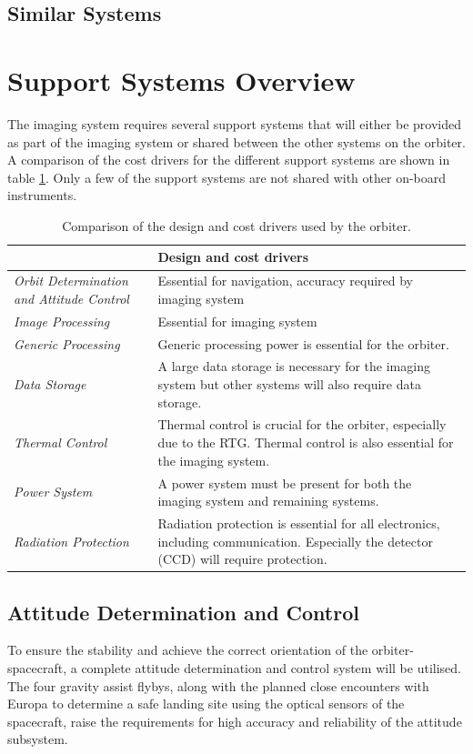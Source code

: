 \subsection{Similar Systems}
\section{Support Systems Overview}
The imaging system requires several support systems that will either be provided as part of the imaging system or shared between the other systems on the orbiter. A comparison of the cost drivers for the different support systems are shown in table \ref{tab:design_cost_driver}. Only a few of the support systems are not shared with other on-board instruments.
\begin{table}[h!]
  \centering
\begin{tabular}{p{4cm}|p{11cm}}
\toprule
      & \textbf{Design and cost drivers} \\
\midrule
\textit{Orbit Determination and Attitude Control} & Essential for navigation, accuracy required by imaging system \\
\textit{Image Processing} & Essential for imaging system \\
\textit{Generic Processing} & Generic processing power is essential for the orbiter. \\
\textit{Data Storage} & A large data storage is necessary for the imaging system but other systems will also require data storage. \\
\textit{Thermal Control} & Thermal control is crucial for the orbiter, especially due to the RTG. Thermal control is also essential for the imaging system. \\
\textit{Power System} & A power system must be present for both the imaging system and remaining systems. \\
\textit{Radiation Protection} & Radiation protection is essential for all electronics, including communication. Especially the detector (CCD) will require protection. \\
\bottomrule
\end{tabular}%
  \caption{Comparison of the design and cost drivers used by the orbiter.}
  \label{tab:design_cost_driver}%
\end{table}%
\subsection{Attitude Determination and Control}
To ensure the stability and achieve the correct orientation of the orbiter-spacecraft, a complete attitude determination and control system will be utilised. The four gravity assist flybys, along with the planned close encounters with Europa to determine a safe landing site using the optical sensors of the spacecraft, raise the requirements for high accuracy and reliability of the attitude subsystem.

